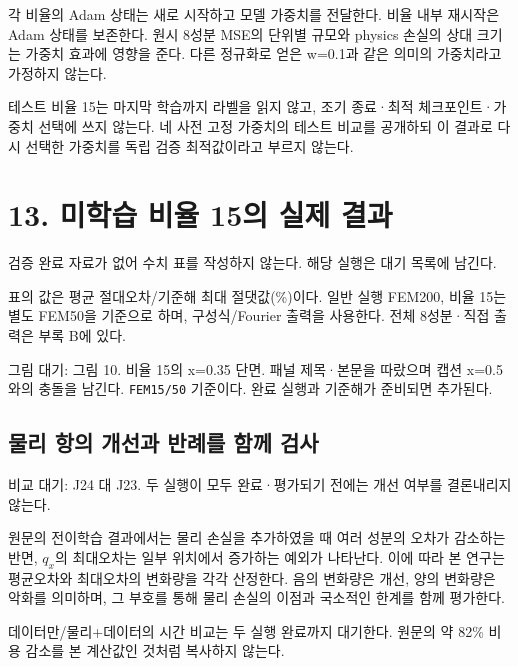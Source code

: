 \documentclass[10pt,a4paper]{article}
\begin{document}
각 비율의 Adam 상태는 새로 시작하고 모델 가중치를 전달한다. 비율 내부 재시작은 Adam 상태를 보존한다. 원시 8성분 MSE의 단위별 규모와 physics 손실의 상대 크기는 가중치 효과에 영향을 준다. 다른 정규화로 얻은 w=0.1과 같은 의미의 가중치라고 가정하지 않는다.\par

테스트 비율 15는 마지막 학습까지 라벨을 읽지 않고, 조기 종료·최적 체크포인트·가중치 선택에 쓰지 않는다. 네 사전 고정 가중치의 테스트 비교를 공개하되 이 결과로 다시 선택한 가중치를 독립 검증 최적값이라고 부르지 않는다.\par

\clearpage

\section{13. 미학습 비율 15의 실제 결과}

{\small\color{muted} 검증 완료 자료가 없어 수치 표를 작성하지 않는다. 해당 실행은 대기 목록에 남긴다.\par}

{\small\color{muted} 표의 값은 평균 절대오차/기준해 최대 절댓값(\%)이다. 일반 실행 FEM200, 비율 15는 별도 FEM50을 기준으로 하며, 구성식/Fourier 출력을 사용한다. 전체 8성분·직접 출력은 부록 B에 있다.\par}

{\small\color{muted} 그림 대기: 그림 10. 비율 15의 x=0.35 단면. 패널 제목·본문을 따랐으며 캡션 x=0.5와의 충돌을 남긴다. \nolinkurl{FEM15/50} 기준이다. 완료 실행과 기준해가 준비되면 추가된다.\par}

\subsection{물리 항의 개선과 반례를 함께 검사}

{\small\color{muted} 비교 대기: J24 대 J23. 두 실행이 모두 완료·평가되기 전에는 개선 여부를 결론내리지 않는다.\par}

원문의 전이학습 결과에서는 물리 손실을 추가하였을 때 여러 성분의 오차가 감소하는 반면, $q_x$의 최대오차는 일부 위치에서 증가하는 예외가 나타난다. 이에 따라 본 연구는 평균오차와 최대오차의 변화량을 각각 산정한다. 음의 변화량은 개선, 양의 변화량은 악화를 의미하며, 그 부호를 통해 물리 손실의 이점과 국소적인 한계를 함께 평가한다.\par

{\small\color{muted} 데이터만/물리+데이터의 시간 비교는 두 실행 완료까지 대기한다. 원문의 약 82\% 비용 감소를 본 계산값인 것처럼 복사하지 않는다.\par}
\end{document}

